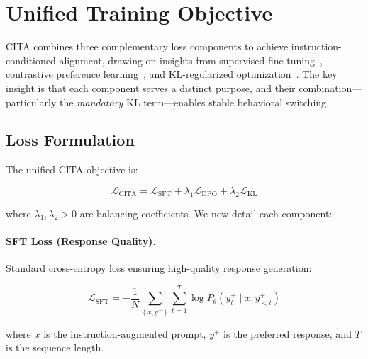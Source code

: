 
\vspace{-2mm}
\section{Unified Training Objective}
\label{sec:unified_loss}

CITA combines three complementary loss components to achieve instruction-conditioned alignment, drawing on insights from supervised fine-tuning~\cite{wei2022finetuned,sanh2022multitask}, contrastive preference learning~\cite{rafailov2023direct,chen2020simple}, and KL-regularized optimization~\cite{schulman2017proximal,korbak2022rl}. The key insight is that each component serves a distinct purpose, and their combination---particularly the \textit{mandatory} KL term---enables stable behavioral switching.

\vspace{-2mm}
\subsection{Loss Formulation}
\label{sec:loss_formulation}

The unified CITA objective is:

\begin{equation}
\mathcal{L}_{\text{CITA}} = \mathcal{L}_{\text{SFT}} + \lambda_1 \mathcal{L}_{\text{DPO}} + \lambda_2 \mathcal{L}_{\text{KL}}
\label{eq:unified_loss}
\end{equation}

where $\lambda_1, \lambda_2 > 0$ are balancing coefficients. We now detail each component:

\paragraph{SFT Loss (Response Quality).}
Standard cross-entropy loss ensuring high-quality response generation:

\begin{equation}
\mathcal{L}_{\text{SFT}} = -\frac{1}{N} \sum_{(x, y^+)} \sum_{t=1}^{T} \log P_\theta(y_t^+ \mid x, y_{<t}^+)
\label{eq:sft_loss}
\end{equation}

where $x$ is the instruction-augmented prompt, $y^+$ is the preferred response, and $T$ is the sequence length.

